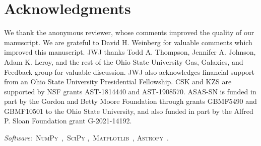 \documentclass[foo.tex]{subfiles}
\begin{document}
\section*{Acknowledgments}
\label{sec:acknowledgments}

We thank the anonymous reviewer, whose comments improved the quality of our
manuscript.
We are grateful to David H. Weinberg for valuable comments which improved this
manuscript.
JWJ thanks Todd A. Thompson, Jennifer A. Johnson, Adam K. Leroy, and the rest
of the Ohio State University Gas, Galaxies, and Feedback group for valuable
discussion.
JWJ also acknowledges financial support from an Ohio State University
Presidential Fellowship.
CSK and KZS are supported by NSF grants AST-1814440 and AST-1908570.
ASAS-SN is funded in part by the Gordon and Betty Moore Foundation through
grants GBMF5490 and GBMF10501 to the Ohio State University, and also funded in
part by the Alfred P. Sloan Foundation grant G-2021-14192.
\par\null\par\noindent
\textit{Software}:~\textsc{NumPy}~\citep{Harris2020},~\textsc{SciPy}
\citep{Virtanen2020},~\textsc{Matplotlib}~\citep{Hunter2007},
\textsc{Astropy}~\citep{Astropy2013, Astropy2018, Astropy2022}.
\end{document}
